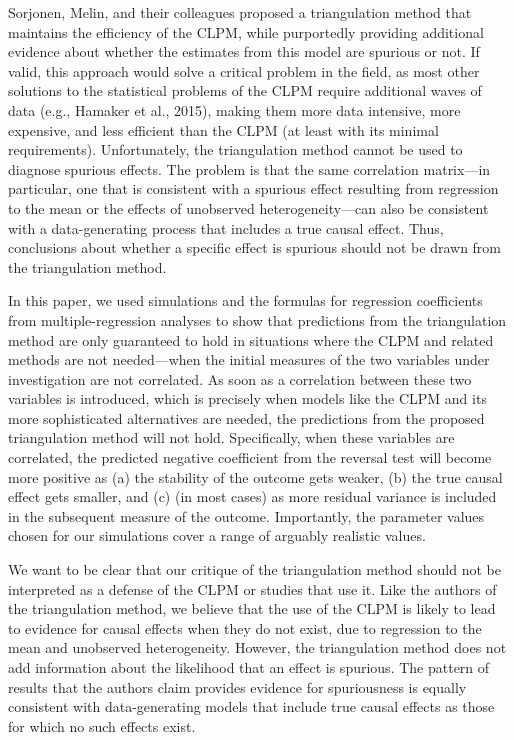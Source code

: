 \documentclass[
  man,mask,floatsintext]{apa6}
\begin{document}
Sorjonen, Melin, and their colleagues proposed a triangulation method that maintains the efficiency of the CLPM, while purportedly providing additional evidence about whether the estimates from this model are spurious or not. If valid, this approach would solve a critical problem in the field, as most other solutions to the statistical problems of the CLPM require additional waves of data (e.g., Hamaker et al., 2015), making them more data intensive, more expensive, and less efficient than the CLPM (at least with its minimal requirements). Unfortunately, the triangulation method cannot be used to diagnose spurious effects. The problem is that the same correlation matrix---in particular, one that is consistent with a spurious effect resulting from regression to the mean or the effects of unobserved heterogeneity---can also be consistent with a data-generating process that includes a true causal effect. Thus, conclusions about whether a specific effect is spurious should not be drawn from the triangulation method.

In this paper, we used simulations and the formulas for regression coefficients from multiple-regression analyses to show that predictions from the triangulation method are only guaranteed to hold in situations where the CLPM and related methods are not needed---when the initial measures of the two variables under investigation are not correlated. As soon as a correlation between these two variables is introduced, which is precisely when models like the CLPM and its more sophisticated alternatives are needed, the predictions from the proposed triangulation method will not hold. Specifically, when these variables are correlated, the predicted negative coefficient from the reversal test will become more positive as (a) the stability of the outcome gets weaker, (b) the true causal effect gets smaller, and (c) (in most cases) as more residual variance is included in the subsequent measure of the outcome. Importantly, the parameter values chosen for our simulations cover a range of arguably realistic values.

We want to be clear that our critique of the triangulation method should not be interpreted as a defense of the CLPM or studies that use it. Like the authors of the triangulation method, we believe that the use of the CLPM is likely to lead to evidence for causal effects when they do not exist, due to regression to the mean and unobserved heterogeneity. However, the triangulation method does not add information about the likelihood that an effect is spurious. The pattern of results that the authors claim provides evidence for spuriousness is equally consistent with data-generating models that include true causal effects as those for which no such effects exist.
\end{document}
